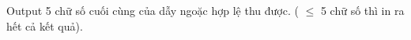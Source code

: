 Output
5 chữ số cuối cùng của dẫy ngoặc hợp lệ thu được. ( $\le$  5 chữ số thì in ra hết cả kết quả).